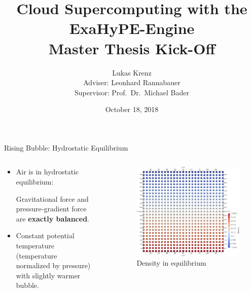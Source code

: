 \documentclass{beamer}
\title{Cloud Supercomputing with the ExaHyPE-Engine\\Master Thesis Kick-Off}
\author{Lukas Krenz\\Adviser: Leonhard Rannabauer\\Supervisor: Prof.\ Dr.\ Michael Bader}
\date{October 18, 2018}
\institute{\textsc{tum}, Chair for Scientific Computing}
\begin{document}
\maketitle
\begin{frame}{Rising Bubble: Hydrostatic Equilibrium}
  \begin{columns}
    \begin{column}[t]{0.5\textwidth}
      \begin{itemize}
      \item 
  Air is in hydrostatic equilibrium:

  Gravitational force and pressure-gradient force are \textbf{exactly balanced}.

  \item Constant potential temperature (temperature normalized by pressure) with slightly warmer bubble.
        
  \end{itemize}
    \end{column}~%
    \begin{column}[t]{0.5\textwidth}
      \begin{figure}[h]
\includegraphics[width=1.0\textwidth]{hydrostatic_density}
\caption{Density in equilibrium}
\end{figure}
    \end{column}
  \end{columns}
\end{frame}
\end{document}
